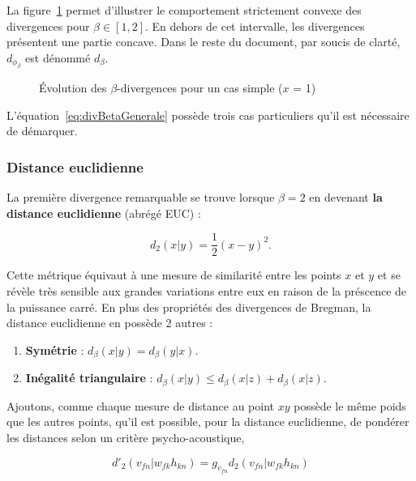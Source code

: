 La figure~\ref{fig:allure-divergence} permet d'illustrer le comportement strictement convexe des divergences pour $\beta \in \left[1,2\right]$. En dehors de cet intervalle, les divergences présentent une partie concave. Dans le reste du document, par soucis de clarté, $d_{\phi_{\beta}}$ est dénommé $d_{\beta}$. \\

\begin{figure}[h]
\centering
\caption{Évolution des $\beta$-divergences pour un cas simple ($x$ = 1)}
\label{fig:allure-divergence}
\end{figure}

L'équation~\ref{eq:divBetaGenerale} possède trois cas particuliers qu'il est nécessaire de démarquer. 

\subsubsection{Distance euclidienne}
La première divergence remarquable se trouve lorsque $\beta = 2$ en devenant \textbf{la distance euclidienne} (abrégé EUC) : 

\begin{equation}
d_{{2}}(x\vert y) = \dfrac{1}{2}(x-y)^2.
\end{equation}

Cette métrique équivaut à une mesure de similarité entre les points $x$ et $y$ et se révèle très sensible aux grandes variations entre eux en raison de la préscence de la puissance carré. En plus des propriétés des divergences de Bregman, la distance euclidienne en possède 2 autres : 
\begin{enumerate}

\item \textbf{Symétrie} : $d_{\beta}(x \vert y ) = d_{\beta}(y \vert x)$.

\item \textbf{Inégalité triangulaire} : $d_{\beta}(x \vert y ) \leq d_{\beta}(x \vert z ) + d_{\beta}(x \vert z )$.\\
\end{enumerate}

Ajoutons, comme chaque mesure de distance au point $xy$ possède le même poids que les autres points, qu'il est possible, pour la distance euclidienne, de pondérer les distances selon un critère psycho-acoustique, 

\begin{equation}
d'_2(v_{fn} \vert w_{fk} h_{kn}) = g_{v_{fn}} d_2 (v_{fn} \vert w_{fk} h_{kn})
\end{equation}

